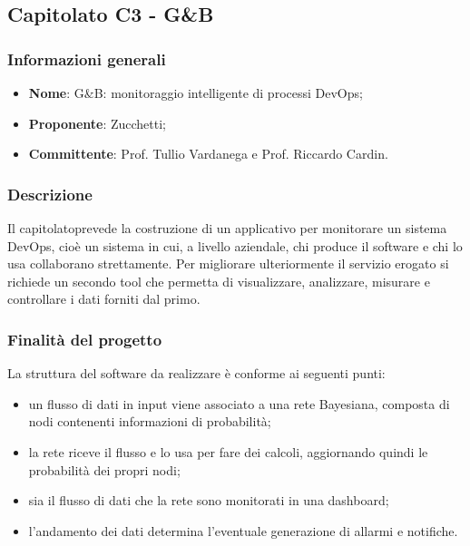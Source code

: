 \subsection{Capitolato C3 - G\&B}
\subsubsection{Informazioni generali}
\begin{itemize}
	\item \textbf{Nome}: G\&B: monitoraggio intelligente di processi DevOps\glo{};
	\item \textbf{Proponente}: Zucchetti;
	\item \textbf{Committente}: Prof. Tullio Vardanega e Prof. Riccardo Cardin.
\end{itemize}
\subsubsection{Descrizione}
Il capitolato\glosp prevede la costruzione di un applicativo per monitorare un sistema 
DevOps\glo{}, cioè un sistema in cui, a livello aziendale, chi produce il software 
e chi lo usa collaborano strettamente. Per migliorare ulteriormente il servizio 
erogato si richiede un secondo tool che permetta di visualizzare, 
analizzare, misurare e controllare i dati forniti dal primo.
\subsubsection{Finalità del progetto}
La struttura del software da realizzare è conforme ai seguenti punti: 
\begin{itemize}
	\item un flusso di dati in input viene associato a una rete Bayesiana\glo{}, 
	composta di nodi contenenti informazioni di probabilità;
	\item la rete riceve il flusso e lo usa per fare dei calcoli, aggiornando
	 quindi le probabilità dei propri nodi;
	\item sia il flusso di dati che la rete sono monitorati in una dashboard\glo{};
	\item l'andamento dei dati determina l'eventuale generazione di allarmi
	 e notifiche.
\end{itemize}

